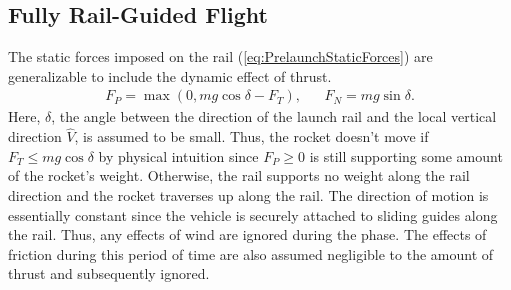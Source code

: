 \documentclass[11pt,dvipsnames]{thesis}
\begin{document}
\subsection{Fully Rail-Guided Flight}
The static forces imposed on the rail (\ref{eq:PrelaunchStaticForces}) are generalizable to include the dynamic effect of thrust.
\begin{align}
F_P = \max(0, mg\cos\delta - F_T), && F_N = mg\sin\delta. \label{eq:FullyRailGuidedFlightRailForces}
\end{align}
Here, $\delta$, the angle between the direction of the launch rail and the local vertical direction $\widehat{V}$, is assumed to be small. Thus, the rocket doesn't move if $F_T \leqslant mg\cos\delta$ by physical intuition since $F_P \geqslant 0$ is still supporting some amount of the rocket's weight. Otherwise, the rail supports no weight along the rail direction and the rocket traverses up along the rail.
The direction of motion is essentially constant since the vehicle is securely attached to sliding guides along the rail. Thus, any effects of wind are ignored during the phase.
The effects of friction during this period of time are also assumed negligible to the amount of thrust and subsequently ignored.
\end{document}
